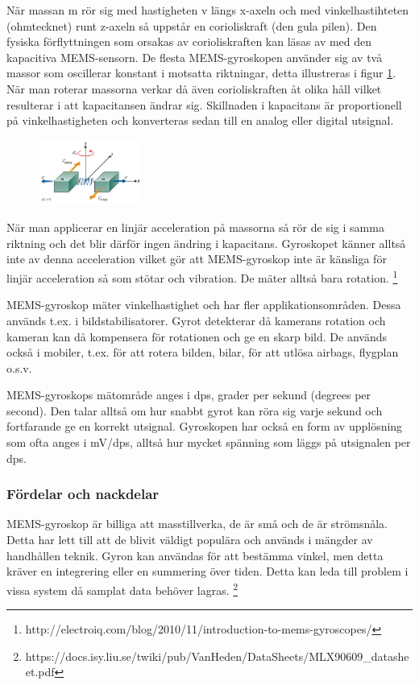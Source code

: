 \documentclass[a4paper,12pt,fleqn]{article}
\begin{document}
När massan m rör sig med hastigheten v längs x-axeln och med vinkelhastihteten (ohmtecknet) runt z-axeln så uppstår en corioliskraft (den gula pilen). Den fysiska förflyttningen som orsakas av corioliskraften kan läsas av med den kapacitiva MEMS-sensorn. De flesta MEMS-gyroskopen använder sig av två massor som oscillerar konstant i motsatta riktningar, detta illustreras i figur \ref{fig:angular}. När man roterar massorna verkar då även corioliskraften åt olika håll vilket resulterar i att kapacitansen ändrar sig. Skillnaden i kapacitans är proportionell på vinkelhastigheten och konverteras sedan till en analog eller digital utsignal.

\begin{figure}[h]
\label{fig:angular}
\caption{}
\includegraphics[width=0.3\textwidth]
{angularv.png}
\end{figure}

När man applicerar en linjär acceleration på massorna så rör de sig i samma riktning och det blir därför ingen ändring i kapacitans. Gyroskopet känner alltså inte av denna acceleration vilket gör att MEMS-gyroskop inte är känsliga för linjär acceleration så som stötar och vibration. De mäter alltså bara rotation.
\footnote{http://electroiq.com/blog/2010/11/introduction-to-mems-gyroscopes/}


MEMS-gyroskop mäter vinkelhastighet och har fler applikationsområden. Dessa används t.ex. i bildstabilisatorer. Gyrot detekterar då kamerans rotation och kameran kan då kompensera för rotationen och ge en skarp bild. De används också i mobiler, t.ex. för att rotera bilden, bilar, för att utlösa airbags, flygplan o.s.v.

MEMS-gyroskops mätområde anges i dps, grader per sekund (degrees per second). Den talar alltså om hur snabbt gyrot kan röra sig varje sekund och fortfarande ge en korrekt utsignal. Gyroskopen har också en form av upplösning som ofta anges i mV/dps, alltså hur mycket spänning som läggs på utsignalen per dps.

\subsubsection{Fördelar och nackdelar}
MEMS-gyroskop är billiga att masstillverka, de är små och de är strömsnåla. Detta har lett till att de blivit väldigt populära och används i mängder av handhållen teknik.
Gyron kan användas för att bestämma vinkel, men detta kräver en integrering eller en summering över tiden. Detta kan leda till problem i vissa system då samplat data behöver lagras.
\footnote{https://docs.isy.liu.se/twiki/pub/VanHeden/DataSheets/MLX90609_datasheet.pdf}
\end{document}
